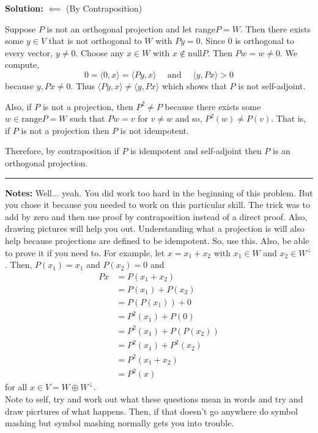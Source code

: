 \documentclass{article}
\begin{document}
\textbf{Solution:} $\impliedby$ (By Contraposition)

Suppose $P$ is not an orthogonal projection and let range$P = W$. Then there exists some $y\in V$ that is not orthogonal to $W$ with $Py = 0$. Since 0 is orthogonal to every vector, $y\neq 0$. Choose any $x\in W$ with $x\not\in\text{null}P$. Then $Pw = w \neq 0$. We compute, 
\[ 0 = \langle 0, x\rangle = \langle Py, x\rangle \quad \text{ and } \quad \langle y, Px \rangle > 0 \]
because $y,Px\neq 0$. Thus $\langle Py, x\rangle \neq \langle y, Px \rangle $ which shows that $P$ is not self-adjoint.

Also, if $P$ is not a projection, then $P^2 \neq P$ because there exists some $w\in \text{range} P = W$ such that $Pw=v$ for $v\neq w$ and so, $P^2(w) \neq P(v)$. That is, if $P$ is not a projection then $P$ is not idempotent. 

Therefore, by contraposition if $P$ is idempotent and self-adjoint then $P$ is an orthogonal projection.\\

\hrule

\textbf{Notes:} Well... yeah. You did work too hard in the beginning of this problem. But you chose it because you needed to work on this particular skill. The trick was to add by zero and then use proof by contraposition instead of a direct proof. Also, drawing pictures will help you out. Understanding what a projection is will also help because projections are defined to be idempotent. So, use this. Also, be able to prove it if you need to. For example, let $x = x_1 + x_2$ with $x_1\in W$ and $x_2\in W^\perp$. Then, $P(x_1) = x_1$ and $P(x_2) = 0$ and
	\begin{align*}
		Px & = P(x_1 + x_2) \\
		     & = P(x_1) + P(x_2)\\
		     & = P(P(x_1)) + 0\\
		     & = P^2(x_1) + P(0)\\
		     & = P^2(x_1) + P(P(x_2))\\
		     & = P^2(x_1) + P^2(x_2)\\
		     & = P^2(x_1+x_2)\\
		     & = P^2(x)
	\end{align*}
for all $x\in V = W\oplus W^\perp$.\\

Note to self, try and work out what these questions mean in words and try and draw picrtures of what happens. Then, if that doesn't go anywhere do symbol mashing but symbol mashing normally gets you into trouble.\\
\end{document}
